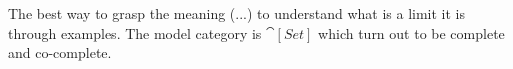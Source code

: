 \documentclass[preview]{standalone}
\begin{document}
\begin{landscape}
	The best way to grasp the meaning (...) to understand what is a limit it is through examples. The model category is $\cat[Set]$ which turn out to be complete and co-complete.
  
\end{landscape}
\end{document}
